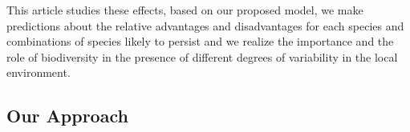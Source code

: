 \documentclass{mcmthesis}
\begin{document}
This article studies these effects, based on our proposed model, we make predictions about the relative advantages and disadvantages for each species and combinations of species likely to persist and we realize the importance and the role of biodiversity in the presence of different degrees of variability in the local environment.




\subsection{Our Approach}
\end{document}
